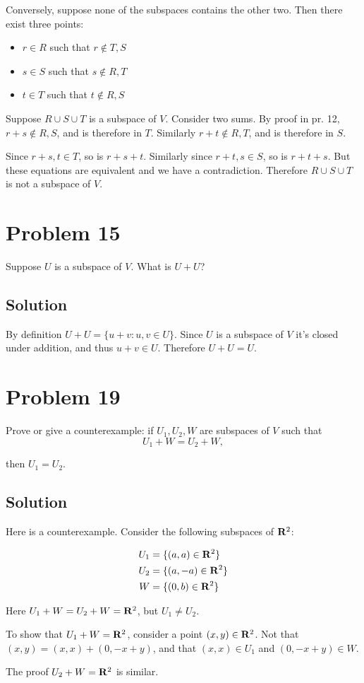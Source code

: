 \documentclass{article}
\begin{document}
\vs

Conversely, suppose none of the subspaces contains the other two. Then there exist three points:
\begin{itemize}
    \item $r\in R$ such that $r\not\in T, S$
    \item $s\in S$ such that $s\not\in R, T$
    \item $t\in T$ such that $t\not\in R, S$
\end{itemize}

Suppose $R\cup S\cup T$ is a subspace of $V$. Consider two sums. By proof in pr. 12, $r+s\not\in R, S$, and is therefore in $T$. Similarly $r+t\not\in R, T$, and is therefore in $S$.

\vs

Since $r+s, t\in T$, so is $r+s+t$. Similarly since $r+t, s\in S$, so is $r+t+s$. But these equations are equivalent and we have a contradiction. Therefore $R\cup S\cup T$ is not a subspace of $V$.

\vs

\section*{Problem 15}
Suppose $U$ is a subspace of $V$. What is $U+U$?

\subsection*{Solution}

By definition $U+U=\{ u + v : u, v\in U \}$. Since $U$ is a subspace of $V$ it's closed under addition, and thus $u+v\in U$. Therefore $U+U=U$.

\section*{Problem 19}
Prove or give a counterexample: if $U_1, U_2, W$ are subspaces of $V$ such that
\[U_1+W=U_2+W,\]

then $U_1=U_2$.

\subsection*{Solution}

Here is a counterexample. Consider the following subspaces of $\mathbf{R}^2$:

\begin{align*}
    U_1&=\{(a, a)\in\mathbf{R}^2\}\\
    U_2&=\{(a, -a)\in\mathbf{R}^2\}\\
    W&=\{(0, b)\in\mathbf{R}^2\}
\end{align*}

Here $U_1+W=U_2+W=\mathbf{R}^2$, but $U_1\neq U_2$.

\vs

To show that $U_1+W=\mathbf{R}^2$, consider a point $(x, y)\in\mathbf{R}^2$. Not that $(x, y)=(x, x)+(0,-x+y)$, and that $(x,x)\in U_1$ and $(0,-x+y)\in W$.

\vs

The proof $U_2+W=\mathbf{R}^2$ is similar.
\end{document}
